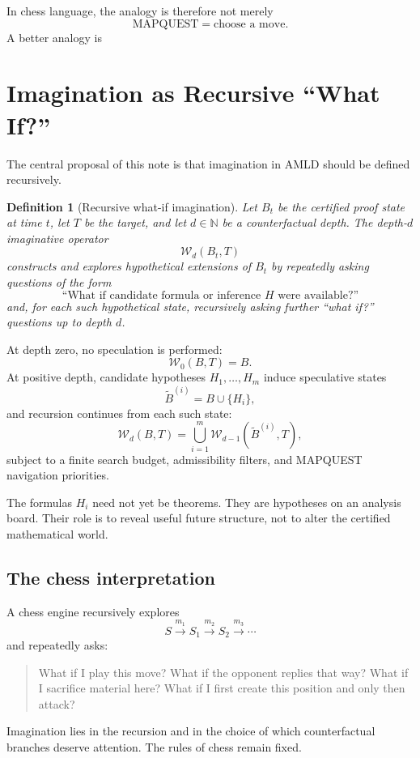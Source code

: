 \documentclass[11pt]{article}
\newtheorem{definition}{Definition}[section]
\newcommand{\W}{\mathcal{W}}
\begin{document}
In chess language, the analogy is therefore not merely
\[
\text{MAPQUEST}=\text{choose a move}.
\]
A better analogy is
\begin{center}
\end{center}

\section{Imagination as Recursive ``What If?''}

The central proposal of this note is that imagination in AMLD should be defined recursively.

\begin{definition}[Recursive what-if imagination]
Let $B_t$ be the certified proof state at time $t$, let $T$ be the target, and let $d\in\mathbb{N}$ be a counterfactual depth. The depth-$d$ imaginative operator
\[
\W_d(B_t,T)
\]
constructs and explores hypothetical extensions of $B_t$ by repeatedly asking questions of the form
\[
\text{``What if candidate formula or inference }H\text{ were available?''}
\]
and, for each such hypothetical state, recursively asking further ``what if?'' questions up to depth $d$.
\end{definition}

At depth zero, no speculation is performed:
\[
\W_0(B,T)=B.
\]
At positive depth, candidate hypotheses $H_1,\dots,H_m$ induce speculative states
\[
\widetilde B^{(i)}=B\cup\{H_i\},
\]
and recursion continues from each such state:
\[
\W_d(B,T)
=
\bigcup_{i=1}^{m}
\W_{d-1}(\widetilde B^{(i)},T),
\]
subject to a finite search budget, admissibility filters, and MAPQUEST navigation priorities.

The formulas $H_i$ need not yet be theorems. They are hypotheses on an analysis board. Their role is to reveal useful future structure, not to alter the certified mathematical world.

\subsection{The chess interpretation}

A chess engine recursively explores
\[
S\xrightarrow{m_1}S_1\xrightarrow{m_2}S_2\xrightarrow{m_3}\cdots
\]
and repeatedly asks:
\begin{quote}
What if I play this move? What if the opponent replies that way? What if I sacrifice material here? What if I first create this position and only then attack?
\end{quote}
Imagination lies in the recursion and in the choice of which counterfactual branches deserve attention. The rules of chess remain fixed.
\end{document}
